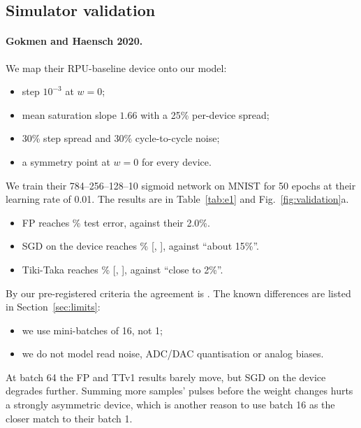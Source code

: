 \subsection{Simulator validation}\label{sec:validation}
\paragraph{Gokmen and Haensch 2020.} We map their RPU-baseline device onto our model:
\begin{itemize}
\item step $10^{-3}$ at $w=0$;
\item mean saturation slope $1.66$ with a 25\% per-device spread;
\item 30\% step spread and 30\% cycle-to-cycle noise;
\item a symmetry point at $w=0$ for every device.
\end{itemize}
We train their 784--256--128--10 sigmoid network on MNIST for 50 epochs at their learning rate of 0.01. The results are in
Table~\ref{tab:e1} and Fig.~\ref{fig:validation}a.
\begin{itemize}
\item FP reaches \REOneFpErr\% test error, against their 2.0\%.
\item SGD on the device reaches \REOneSgdErr\% [\REOneSgdLo, \REOneSgdHi], against ``about 15\%''.
\item Tiki-Taka reaches \REOneTtvOneErr\% [\REOneTtvOneLo, \REOneTtvOneHi], against ``close to 2\%''.
\end{itemize}
By our pre-registered criteria the agreement is \textbf{\REOneVerdict}. The known differences are listed in
Section~\ref{sec:limits}:
\begin{itemize}
\item we use mini-batches of 16, not 1;
\item we do not model read noise, ADC/DAC quantisation or analog biases.
\end{itemize}
At batch 64 the FP and TTv1 results barely move, but SGD on the device degrades further. Summing more samples' pulses before the
weight changes hurts a strongly asymmetric device, which is another reason to use batch 16 as the closer match to their batch 1.

